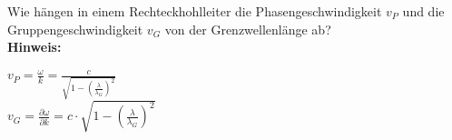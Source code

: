 \begin{question}[section=6,name={Phasen und Gruppengeschwindigkeit},difficulty=,quantity=,type=thr,tags={}]
	Wie hängen in einem Rechteckhohlleiter die Phasengeschwindigkeit $v_P$ und die Gruppengeschwindigkeit $v_G$ von der Grenzwellenlänge ab?
	\\ \textbf{Hinweis:}\\
	
\end{question}
\begin{solution}
	$v_P=\frac{\omega}{k}=\frac{c}{\sqrt{1-\left(\frac{\lambda}{\lambda_G}\right)^2}} $\\
	$v_G=\frac{\partial \omega}{\partial k}=c\cdot\sqrt{1-\left(\frac{\lambda}{\lambda_G}\right)^2} $
\end{solution}